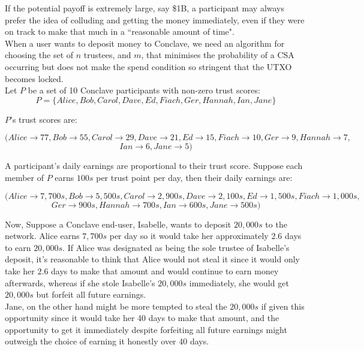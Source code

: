 \documentclass{report}
\begin{document}
			If the potential payoff is extremely large, say \$1B, a participant may always prefer the idea of colluding and getting the money immediately, even if they were on track to make that much in a ``reasonable amount of time". \\
			
			When a user wants to deposit money to Conclave, we need an algorithm for choosing the set of $n$ trustees, and $m$, that minimises the probability of a CSA occurring but does not make the spend condition so stringent that the UTXO becomes locked. \\
			
			Let $P$ be a set of 10 Conclave participants with non-zero trust scores:
			\[P = \{Alice, Bob, Carol, Dave, Ed, Fiach, Ger, Hannah, Ian, Jane\}\]

			$P$'s trust scores are:
			
			\[(Alice \rightarrow 77, Bob \rightarrow 55, Carol \rightarrow 29, Dave \rightarrow 21, Ed \rightarrow 15, Fiach \rightarrow 10, Ger \rightarrow 9, Hannah \rightarrow 7,\]
			\[Ian \rightarrow 6, Jane \rightarrow 5)\]
			
			A participant's daily earnings are proportional to their trust score. Suppose each member of $P$ earns $100s$ per trust point per day, then their daily earnings are:
			
			\[(Alice \rightarrow 7,700s, Bob \rightarrow 5,500s, Carol \rightarrow 2,900s, Dave \rightarrow 2,100s, Ed \rightarrow 1,500s, Fiach \rightarrow 1,000s,\]
			\[Ger \rightarrow 900s, Hannah \rightarrow 700s, Ian \rightarrow 600s, Jane \rightarrow 500s)\]
			
			Now, Suppose a Conclave end-user, Isabelle, wants to deposit $20,000s$ to the network. Alice earns $7,700s$ per day so it would take her approximately $2.6$ days to earn $20,000s$. If Alice was designated as being the sole trustee of Isabelle's deposit, it's reasonable to think that Alice would not steal it since it would only take her $2.6$ days to make that amount and would continue to earn money afterwards, whereas if she stole Isabelle's $20,000s$ immediately, she would get $20,000s$ but forfeit all future earnings. \\
			
			Jane, on the other hand might be more tempted to steal the $20,000s$ if given this opportunity since it would take her 40 days to make that amount, and the opportunity to get it immediately despite forfeiting all future earnings might outweigh the choice of earning it honestly over 40 days. \\
			
\end{document}
